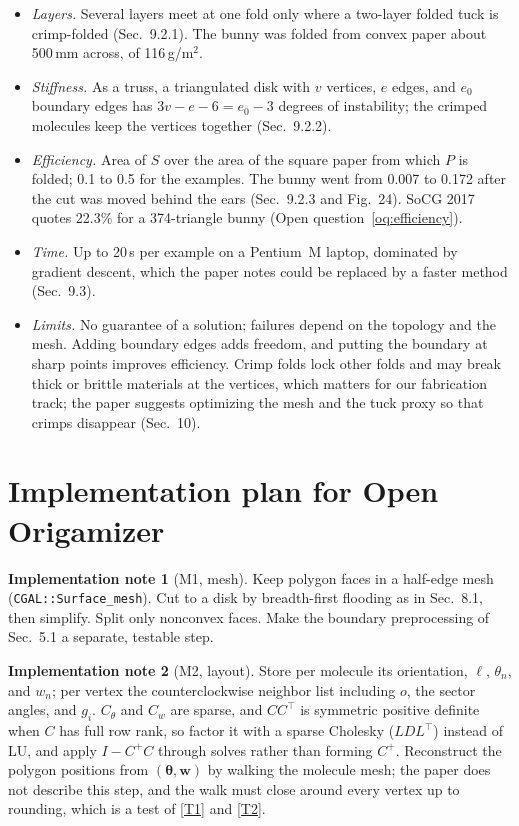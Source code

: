 \documentclass[11pt]{article}
\theoremstyle{definition}
\newtheorem{impl}{Implementation note}
\newcommand{\tv}{\boldsymbol{\theta}}
\newcommand{\wv}{\mathbf{w}}
\begin{document}
\begin{itemize}[nosep]
  \item \emph{Layers.} Several layers meet at one fold only where a two-layer
    folded tuck is crimp-folded (Sec.~9.2.1). The bunny was folded from convex
    paper about 500\,mm across, of 116\,g/m$^2$.
  \item \emph{Stiffness.} As a truss, a triangulated disk with $v$ vertices,
    $e$ edges, and $e_0$ boundary edges has $3v - e - 6 = e_0 - 3$ degrees of
    instability; the crimped molecules keep the vertices together (Sec.~9.2.2).
  \item \emph{Efficiency.} Area of $S$ over the area of the square paper from
    which $P$ is folded; 0.1 to 0.5 for the examples. The bunny went from 0.007
    to 0.172 after the cut was moved behind the ears (Sec.~9.2.3 and Fig.~24).
    SoCG 2017 quotes 22.3\% for a 374-triangle bunny (Open
    question~\ref{oq:efficiency}).
  \item \emph{Time.} Up to 20\,s per example on a Pentium~M laptop, dominated by
    gradient descent, which the paper notes could be replaced by a faster
    method (Sec.~9.3).
  \item \emph{Limits.} No guarantee of a solution; failures depend on the
    topology and the mesh. Adding boundary edges adds freedom, and putting the
    boundary at sharp points improves efficiency. Crimp folds lock other folds
    and may break thick or brittle materials at the vertices, which matters for
    our fabrication track; the paper suggests optimizing the mesh and the tuck
    proxy so that crimps disappear (Sec.~10).
\end{itemize}

\section{Implementation plan for Open Origamizer}

\begin{impl}[M1, mesh]
Keep polygon faces in a half-edge mesh (\texttt{CGAL::\allowbreak Surface\_mesh}). Cut to a
disk by breadth-first flooding as in Sec.~8.1, then simplify. Split only
nonconvex faces. Make the boundary preprocessing of Sec.~5.1 a separate,
testable step.
\end{impl}

\begin{impl}[M2, layout]
Store per molecule its orientation, $\ell$, $\theta_n$, and $w_n$; per vertex
the counterclockwise neighbor list including $o$, the sector angles, and $g_i$.
$C_\theta$ and $C_w$ are sparse, and $C C^\top$ is symmetric positive definite
when $C$ has full row rank, so factor it with a sparse Cholesky
($LDL^\top$) instead of LU, and apply $I - C^+C$ through solves rather than
forming $C^+$. Reconstruct the polygon positions from $(\tv, \wv)$ by walking
the molecule mesh; the paper does not describe this step, and the walk must
close around every vertex up to rounding, which is a test of \eqref{T1} and
\eqref{T2}.
\end{impl}
\end{document}
